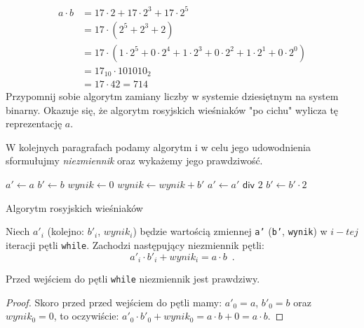 \begin{equation*} 
\begin{split}
a \cdot b &= 17\cdot2 + 17\cdot2^3 + 17\cdot2^5 \\
&= 17 \cdot ( 2^5 + 2^3 + 2) \\
&= 17 \cdot ( 1 \cdot 2^5 + 0 \cdot 2^4 + 1 \cdot 2^3 + 0 \cdot 2^2 + 1 \cdot 2^1 + 0 \cdot 2^0 ) \\
&=17_{10} \cdot 101010_2 \\
&=17 \cdot 42 = 714
\end{split}
\end{equation*}
Przypomnij sobie algorytm zamiany liczby w systemie dziesiętnym na system binarny.
Okazuje się, że algorytm rosyjskich wieśniaków "po cichu" wylicza tę reprezentację $a$.

W kolejnych paragrafach podamy algorytm i w celu jego udowodnienia sformułujmy \textit{niezmiennik} oraz wykażemy jego prawdziwość.

\begin{algorithm}[h]
  \DontPrintSemicolon
  
  
  
  $a' \leftarrow a$\;
  $b' \leftarrow b$\;
  $wynik \leftarrow 0$\;
  {
    {
      $wynik \leftarrow wynik + b'$\;
    }
    $a' \leftarrow a' \textsf{ div } 2$\;
    $b' \leftarrow b' \cdot 2$\;
  }
  
  \caption{Algorytm rosyjskich wieśniaków}
  \label{alg-wiesniakow}
\end{algorithm}

\begin{theorem}
Niech $a'_i$ (kolejno: $b'_i$, $wynik_i$) będzie wartością zmiennej \texttt{a'} (\texttt{b'}, \texttt{wynik}) w $i-tej$ iteracji pętli \texttt{while}. Zachodzi następujący niezmiennik pętli:
\[
a'_i \cdot b'_i + wynik_i = a \cdot b \enspace.
\]
\end{theorem}

\begin{lemma}
Przed wejściem do pętli \texttt{while} niezmiennik jest prawdziwy.
\end{lemma}
\begin{proof}
Skoro przed przed wejściem do pętli mamy: $a'_0 = a$, $b'_0 = b$ oraz $wynik_0 = 0$, to oczywiście: $a'_0 \cdot b'_0 + wynik_0 = a \cdot b + 0 = a \cdot b$.
\end{proof}

